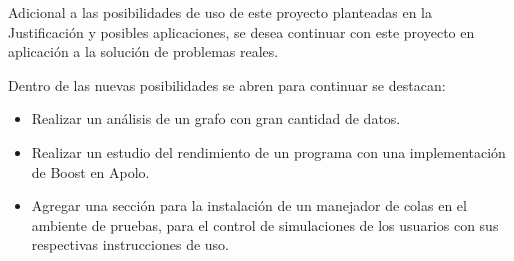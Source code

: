 Adicional a las posibilidades de uso de este proyecto planteadas en la Justificación y posibles aplicaciones, se desea continuar con este proyecto en aplicación a la solución de problemas reales. 

Dentro de las nuevas posibilidades se abren para continuar se destacan: 

\begin{itemize}
	\item Realizar un análisis de un grafo con gran cantidad de datos.
	
	\item Realizar un estudio del rendimiento de un programa con una implementación de Boost en Apolo.

	\item Agregar una sección para la instalación de un manejador de colas en el ambiente de pruebas, para el control de simulaciones de los usuarios con sus respectivas instrucciones de uso. 
	
\end{itemize}